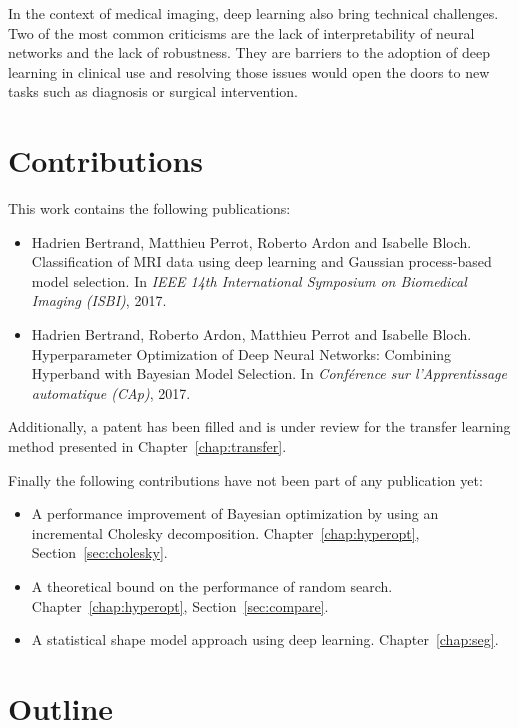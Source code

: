 In the context of medical imaging, deep learning also bring technical challenges. Two of the most common criticisms are the lack of interpretability of neural networks and the lack of robustness. They are barriers to the adoption of deep learning in clinical use and resolving those issues would open the doors to new tasks such as diagnosis or surgical intervention. 

\section{Contributions}

This work contains the following publications:
\begin{itemize}
    \item Hadrien Bertrand, Matthieu Perrot, Roberto Ardon and Isabelle Bloch. Classification of MRI data using deep learning and Gaussian process-based model selection. In \textit{IEEE 14th International Symposium on Biomedical Imaging (ISBI)}, 2017.
    \item Hadrien Bertrand, Roberto Ardon, Matthieu Perrot and Isabelle Bloch. Hyperparameter Optimization of Deep Neural Networks: Combining Hyperband with Bayesian Model Selection. In \textit{Conférence sur l’Apprentissage automatique (CAp)}, 2017.
\end{itemize}

Additionally, a patent has been filled and is under review for the transfer learning method presented in Chapter~\ref{chap:transfer}.

Finally the following contributions have not been part of any publication yet:
\begin{itemize}
    \item A performance improvement of Bayesian optimization by using an incremental Cholesky decomposition. Chapter~\ref{chap:hyperopt}, Section~\ref{sec:cholesky}.
    \item A theoretical bound on the performance of random search. Chapter~\ref{chap:hyperopt}, Section~\ref{sec:compare}.
    \item A statistical shape model approach using deep learning. Chapter~\ref{chap:seg}.
\end{itemize}

\section{Outline}

